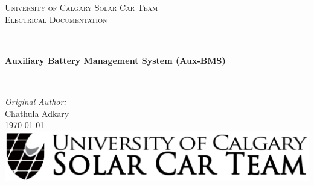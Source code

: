 \begin{titlepage}

\newcommand{\HRule}{\rule{\linewidth}{0.5mm}} %

\center %
 

\textsc{\LARGE University of Calgary Solar Car Team}\\[1.5cm] %
\textsc{\Large Electrical Documentation}\\[0.5cm] %


\HRule \\[0.4cm]
  { \huge \bfseries Auxiliary Battery Management System (Aux-BMS)}\\[0.4cm] %
\HRule \\[1.5cm]
 

\Large \emph{Original Author:}\\
Chathula Adkary \\[3cm] %


{\large \today}\\[2cm] %


\includegraphics[width=\textwidth]{../../Images/Logos/logo-wide.png}\\[1cm] %
 

\vfill %

\end{titlepage}

